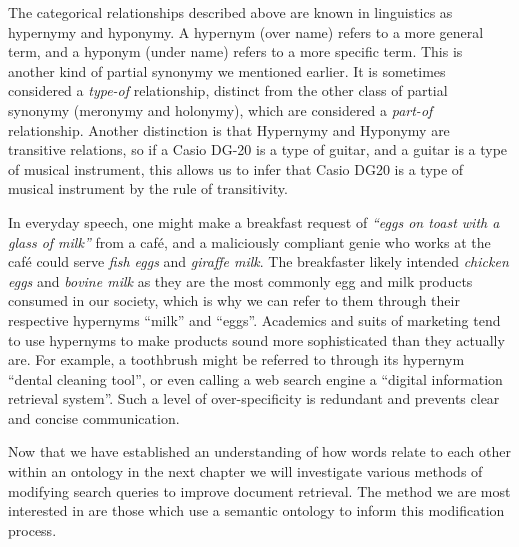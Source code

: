
The categorical relationships described above are known in linguistics as hypernymy and hyponymy. A hypernym (over name) refers to a more general term, and a hyponym (under name) refers to a more specific term. This is another kind of partial synonymy we mentioned earlier. It is sometimes considered a \textit{type-of} relationship, distinct from the other class of partial synonymy (meronymy and holonymy), which are considered a \textit{part-of} relationship. Another distinction is that Hypernymy and Hyponymy are transitive relations, so if a Casio DG-20 is a type of guitar, and a guitar is a type of musical instrument, this allows us to infer that Casio DG20 is a type of musical instrument by the rule of transitivity.

In everyday speech, one might make a breakfast request of \textit{``eggs on toast with a glass of milk''} from a caf{\'e}, and a maliciously compliant genie who works at the caf{\'e} could serve \textit{fish eggs} and \textit{giraffe milk}. The breakfaster likely intended \textit{chicken eggs} and \textit{bovine milk} as they are the most commonly egg and milk products consumed in our society, which is why we can refer to them through their respective hypernyms ``milk'' and ``eggs''. Academics and suits of marketing tend to use hypernyms to make products sound more sophisticated than they actually are. For example, a toothbrush might be referred to through its hypernym ``dental cleaning tool'', or even calling a web search engine a ``digital information retrieval system''. Such a level of over-specificity is redundant and prevents clear and concise communication.

Now that we have established an understanding of how words relate to each other within an ontology in the next chapter we will investigate various methods of modifying search queries to improve document retrieval. The method we are most interested in are those which use a semantic ontology to inform this modification process.
